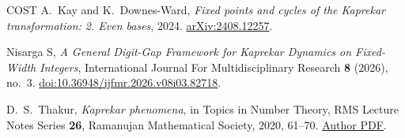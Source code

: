 \documentclass[11pt,reqno]{amsart}
\theoremstyle{remark}
\begin{document}
\begin{thebibliography}{COST}
A.~Kay and K.~Downes-Ward, \emph{Fixed points and cycles of the Kaprekar transformation: 2. Even bases}, 2024.
\href{https://arxiv.org/abs/2408.12257}{arXiv:2408.12257}.

Nisarga S, \emph{A General Digit-Gap Framework for Kaprekar Dynamics on Fixed-Width Integers},
International Journal For Multidisciplinary Research \textbf{8} (2026), no.~3.
\href{https://doi.org/10.36948/ijfmr.2026.v08i03.82718}{doi:10.36948/ijfmr.2026.v08i03.82718}.

D.~S.~Thakur, \emph{Kaprekar phenomena}, in Topics in Number Theory,
RMS Lecture Notes Series \textbf{26}, Ramanujan Mathematical Society, 2020, 61--70.
\href{https://www.sas.rochester.edu/mth/sites/dinesh-thakur/kaprekar.pdf}{Author PDF}.

\end{thebibliography}
\endgroup
\end{document}
